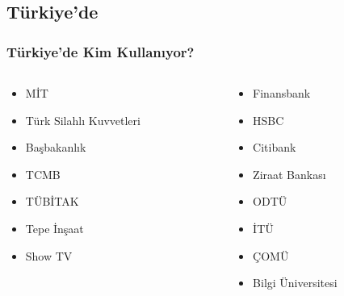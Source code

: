 \documentclass{beamer}
\begin{document}
	\subsection{Türkiye'de}
		\begin{frame}
		 
			\frametitle{Türkiye'de Kim Kullanıyor?}
			\begin{columns}
			\begin{column}[l]{5cm}
				\begin{itemize}
					\item MİT
					\item Türk Silahlı Kuvvetleri
					\item Başbakanlık
					\item TCMB
					\item TÜBİTAK
					\item Tepe İnşaat
					\item Show TV
				\end{itemize}
			\end{column}
			\begin{column}[r]{5cm}
				\begin{itemize}

					\item Finansbank
					\item HSBC
					\item Citibank
					\item Ziraat Bankası
					\item ODTÜ
					\item İTÜ
					\item ÇOMÜ
					\item Bilgi Üniversitesi
				\end{itemize}
			\end{column}
			\end{columns}

		\end{frame}
\end{document}
